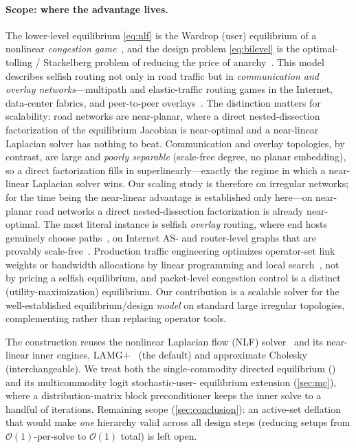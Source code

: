 \documentclass[ijoc]{informs3}
\begin{document}
\paragraph{Scope: where the advantage lives.}
The lower-level equilibrium \cref{eq:nlf} is the Wardrop (user) equilibrium of a nonlinear \emph{congestion
game}~\citep{rosenthal1973,roughgarden2002}, and the design problem \cref{eq:bilevel} is the optimal-tolling /
Stackelberg problem of reducing the price of anarchy~\citep{swamy2012,korilis1997}. This model describes selfish
routing not only in road traffic but in \emph{communication and overlay networks}---multipath and elastic-traffic
routing games in the Internet, data-center fabrics, and peer-to-peer overlays~\citep{orda1993,larroca2013}. The
distinction matters for scalability: road networks are near-planar, where a direct nested-dissection
factorization of the equilibrium Jacobian is near-optimal and a near-linear Laplacian solver has nothing to
beat. Communication and overlay topologies, by contrast, are large and \emph{poorly separable} (scale-free
degree, no planar embedding), so a direct factorization fills in superlinearly---exactly the regime in which a
near-linear Laplacian solver wins. Our scaling study is therefore on irregular networks; for the time being the near-linear advantage is
established only here---on near-planar road networks a direct nested-dissection factorization is already
near-optimal. The most literal instance is selfish
\emph{overlay} routing, where end hosts genuinely choose paths~\citep{qiu2003}, on Internet AS- and router-level
graphs that are provably scale-free~\citep{faloutsos1999}. Production traffic engineering
optimizes operator-set link weights or bandwidth allocations by linear programming and local
search~\citep{fortz2000}, not by pricing a selfish equilibrium, and packet-level congestion control is a distinct
(utility-maximization) equilibrium. Our contribution is a scalable solver for the well-established
equilibrium/design \emph{model} on standard large irregular topologies, complementing rather than replacing
operator tools.

The construction reuses the nonlinear Laplacian flow (NLF) solver~\citep{nlf} and its near-linear inner engines,
LAMG$+$~\citep{lamgplus} (the default) and approximate Cholesky~\citep{kyngsachdeva2016} (interchangeable). We treat both the single-commodity
directed equilibrium () and its multicommodity logit stochastic-user-
equilibrium extension (\cref{sec:mc}), where a distribution-matrix block preconditioner keeps the inner solve
to a handful of iterations. Remaining scope (\cref{sec:conclusion}): an active-set deflation that would make \emph{one}
hierarchy valid across all design steps (reducing setups from $\mathcal{O}(1)$-per-solve to $\mathcal{O}(1)$
total) is left open.
\end{document}
